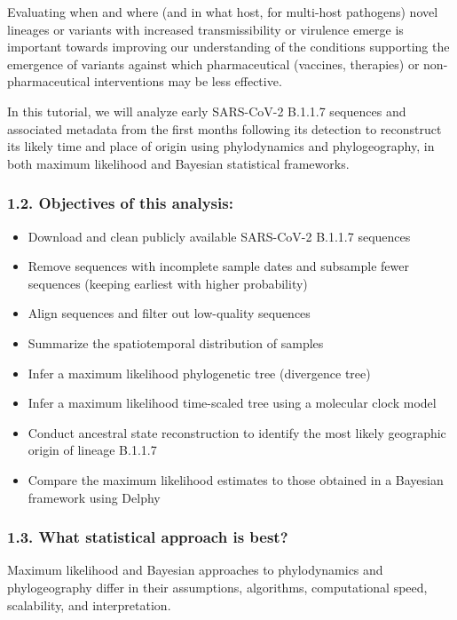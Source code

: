 \documentclass[
]{book}
\begin{document}
Evaluating when and where (and in what host, for multi-host pathogens) novel lineages or variants with increased transmissibility or virulence emerge is important towards improving our understanding of the conditions supporting the emergence of variants against which pharmaceutical (vaccines, therapies) or non-pharmaceutical interventions may be less effective.

In this tutorial, we will analyze early SARS-CoV-2 B.1.1.7 sequences and associated metadata from the first months following its detection to reconstruct its likely time and place of origin using phylodynamics and phylogeography, in both maximum likelihood and Bayesian statistical frameworks.

\subsubsection{1.2. Objectives of this analysis:}\label{objectives-of-this-analysis}

\begin{itemize}
\item
  Download and clean publicly available SARS-CoV-2 B.1.1.7 sequences
\item
  Remove sequences with incomplete sample dates and subsample fewer sequences (keeping earliest with higher probability)
\item
  Align sequences and filter out low-quality sequences
\item
  Summarize the spatiotemporal distribution of samples
\item
  Infer a maximum likelihood phylogenetic tree (divergence tree)
\item
  Infer a maximum likelihood time-scaled tree using a molecular clock model
\item
  Conduct ancestral state reconstruction to identify the most likely geographic origin of lineage B.1.1.7
\item
  Compare the maximum likelihood estimates to those obtained in a Bayesian framework using Delphy
\end{itemize}

\subsubsection{1.3. What statistical approach is best?}\label{what-statistical-approach-is-best}

Maximum likelihood and Bayesian approaches to phylodynamics and phylogeography differ in their assumptions, algorithms, computational speed, scalability, and interpretation.
\end{document}
